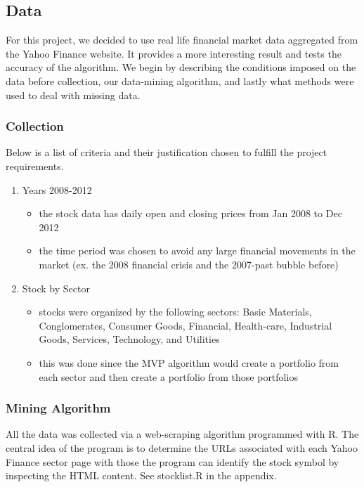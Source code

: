 \documentclass[12pt,titlepage,letter]{article}
\begin{document}
	\subsection{Data}
		For this project, we decided to use real life financial market data aggregated from the Yahoo Finance website. It provides a more interesting result and tests the accuracy of the algorithm. We begin by describing the conditions imposed on the data before collection, our data-mining algorithm, and lastly what methods were used to deal with missing data.
		\subsubsection{Collection}
			Below is a list of criteria and their justification chosen to fulfill the project requirements. 
			\begin{enumerate}
				\item Years 2008-2012
				\begin{itemize}
					\item the stock data has daily open and closing prices from Jan 2008 to Dec 2012
					\item the time period was chosen to avoid any large financial movements in the market (ex. the 2008 financial crisis and the 2007-past bubble before)
				\end{itemize}
					\item Stock by Sector
				\begin{itemize}
					\item stocks were organized by the following sectors: Basic Materials, Conglomerates, Consumer Goods, Financial, Health-care, Industrial Goods, Services, Technology, and Utilities
					\item this was done since the MVP algorithm would create a portfolio from each sector and then create a portfolio from those portfolios
				\end{itemize}
			\end{enumerate}

		\subsubsection{Mining Algorithm}
			All the data was collected via a web-scraping algorithm programmed with R. The central idea of the program is to determine the URLs associated with each Yahoo Finance sector page with those the program can identify the stock symbol by inspecting the HTML content. See stocklist.R in the appendix.\\
\end{document}

